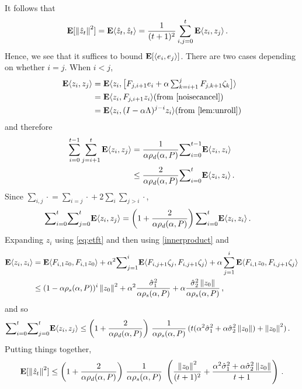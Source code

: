 It follows that 
\begin{align*}
\mathbf{E}[\left\| \hat{z}_t\right\|^2]&=\mathbf{E}\langle\hat{z}_t,\hat{z}_t\rangle
=\frac{1}{(t+1)^2} \sum_{i,j=0}^t \mathbf{E}\langle z_i,z_j\rangle\,.
\end{align*}
Hence, we see that it suffices to bound $\mathbf{E}[\langle e_i,  e_j \rangle]$.
There are two cases depending on whether $i=j$. When $i< j$,
\begin{align*}
\E\ip{z_i,z_j}
&=\E \ip{z_i,\big[F_{j,i+1} e_i+\alpha\textstyle\sum_{k=i+1}^j F_{j,k+1}\zeta_{k}\big]}\\
&=\E\ip{z_i,F_{j,i+1} z_i}  \text{(from \cref{noisecancel})}\\
&=\E\ip{z_i, (I-\alpha \Lambda)^{j-i} z_i} \text{(from \cref{lem:unroll})}
\end{align*}
and therefore
\begin{align*}
\label{inter}
\sum_{i=0}^{t-1}\sum_{j=i+1}^t \mathbf{E}\langle z_i,z_j\rangle
&=\frac1{\alpha\rho_d(\alpha,P)} {\sum}_{i=0}^{t-1}\mathbf{E}\langle z_i,z_i\rangle\\
&\leq \frac2{\alpha\rho_d(\alpha,P)}{\sum}_{i=0}^{t}\mathbf{E}\langle z_i,z_i\rangle\,.
\end{align*}
Since $\sum_{i,j}\cdot{} = \sum_{i=j}\cdot{} + 2 \sum_i \sum_{j>i} \cdot{}$,
\begin{align*}
{\sum}_{i=0}^{t}{\sum}_{j=0}^{t} \mathbf{E}\langle z_i,z_j\rangle&= \left(1+\frac2{\alpha\rho_d(\alpha,P)}\right){\sum}_{i=0}^{t}\mathbf{E}\langle z_i,z_i\rangle\,.
\end{align*}
Expanding $z_i$ using \eqref{eq:etft} and then using \cref{innerproduct} and 
\begin{align*}
\mathbf{E}\langle z_i,z_i\rangle&=\mathbf{E}\langle F_{i,1}z_0,F_{i,1}z_0\rangle+\alpha^2{\sum}_{j=1}^i\mathbf{E}\langle F_{i,j+1}\zeta_j, F_{i,j+1}\zeta_j\rangle+\alpha\sum_{j=1}^i  \mathbf{E}\langle F_{i,1} z_0, F_{i,j+1}\zeta_j\rangle\\
&\leq (1-\alpha\rho_s(\alpha,P))^i\left\| z_0\right\|^2+ \alpha^2\frac{\hat{\sigma}_1^2}{\alpha \rho_s(\alpha,P)}+ \alpha \frac{\hat{\sigma}^2_2 \left\| z_0\right\|}{\alpha\rho_s(\alpha,P)}\,,
\end{align*}
and so
\begin{align*}
{\sum}_{i=0}^{t}{\sum}_{j=0}^{t} \mathbf{E}\langle z_i,z_j\rangle
&\leq \left(1+\frac2{\alpha\rho_d(\alpha,P) }\right)\, \frac1{\alpha\rho_s(\alpha,P)}\, (t(\alpha^2\hat{\sigma}_1^2+\alpha \hat{\sigma}^2_2\left\| z_0\right\|) +\left\| z_0\right\|^2)\,.
\end{align*}
Putting things together,
\begin{align}
\mathbf{E}[\left\| \hat{z}_t\right\|^2]
\leq \left(1+\frac2{\alpha\rho_d(\alpha,P)}\right)\, \frac1{\alpha\rho_s(\alpha,P)}\, \,
\left(\frac{\left\| z_0\right\|^2}{(t+1)^2}+ \frac{\alpha^2\hat{\sigma}_1^2+\alpha \hat{\sigma}^2_2\left\| z_0\right\|}{t+1} \right)\,.
\end{align}


